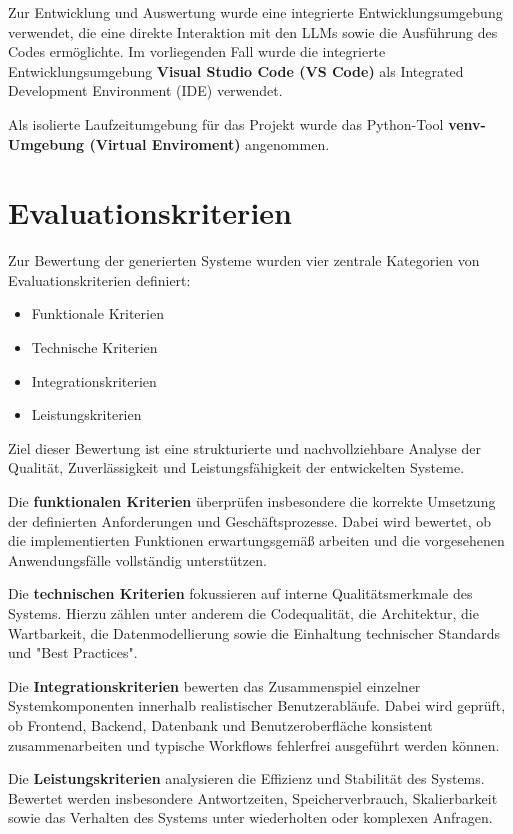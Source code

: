Zur Entwicklung und Auswertung wurde eine integrierte
Entwicklungsumgebung verwendet, die eine direkte
Interaktion mit den LLMs sowie die Ausführung des Codes
ermöglichte. Im vorliegenden Fall wurde die integrierte Entwicklungsumgebung \textbf{Visual Studio Code (VS Code)}  als Integrated Development Environment (IDE) verwendet.

Als isolierte Laufzeitumgebung für das Projekt wurde das Python-Tool \textbf{venv-Umgebung (Virtual Enviroment)} angenommen. 


\chapter{Evaluationskriterien}
\label{chapter-evaluation-criteria}

Zur Bewertung der generierten Systeme wurden vier zentrale Kategorien von Evaluationskriterien definiert:
\begin{itemize}
    \item Funktionale Kriterien
    \item Technische Kriterien
    \item Integrationskriterien
    \item Leistungskriterien
\end{itemize}

Ziel dieser Bewertung ist eine strukturierte und nachvollziehbare Analyse der Qualität, Zuverlässigkeit und Leistungsfähigkeit der entwickelten Systeme.

Die \textbf{funktionalen Kriterien} überprüfen insbesondere die korrekte Umsetzung der definierten Anforderungen und Geschäftsprozesse. Dabei wird bewertet, ob die implementierten Funktionen erwartungsgemäß arbeiten und die vorgesehenen Anwendungsfälle vollständig unterstützen.

Die \textbf{technischen Kriterien} fokussieren auf interne Qualitätsmerkmale des Systems. Hierzu zählen unter anderem die Codequalität, die Architektur, die Wartbarkeit, die Datenmodellierung sowie die Einhaltung technischer Standards und "Best Practices".

Die \textbf{Integrationskriterien} bewerten das Zusammenspiel einzelner Systemkomponenten innerhalb realistischer Benutzerabläufe. Dabei wird geprüft, ob Frontend, Backend, Datenbank und Benutzeroberfläche konsistent zusammenarbeiten und typische Workflows fehlerfrei ausgeführt werden können.

Die \textbf{Leistungskriterien} analysieren die Effizienz und Stabilität des Systems. Bewertet werden insbesondere Antwortzeiten, Speicherverbrauch, Skalierbarkeit sowie das Verhalten des Systems unter wiederholten oder komplexen Anfragen.

